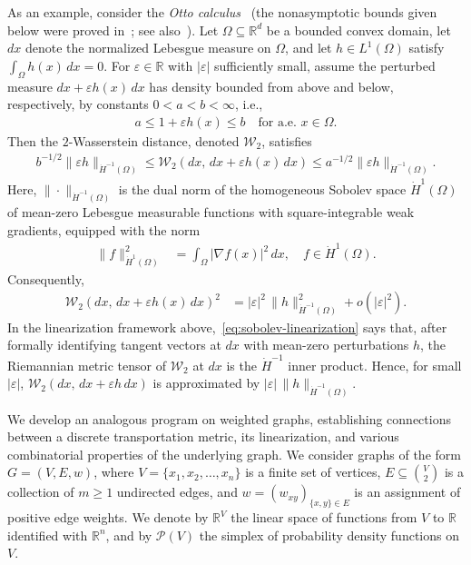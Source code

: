 \documentclass[11pt,a4paper]{article}
\newcommand{\Wass}{\mathcal{W}}
\newcommand{\Prob}{\mathscr{P}}
\begin{document}
As an example, consider the \emph{Otto calculus}~\cite{otto2001geometry} (the nonasymptotic bounds given below were proved in~\cite{peyre2018comparison}; see also~\cite[Sec. 5.5.2]{santambrogio2015optimal}). Let $\Omega\subseteq\mathbb{R}^{d}$ be a bounded convex domain, let $dx$ denote the normalized Lebesgue measure on $\Omega$, and let $h\in L^{1}(\Omega)$ satisfy $\int_{\Omega} h(x)\,dx = 0$. For $\varepsilon\in\mathbb{R}$ with $|\varepsilon|$ sufficiently small, assume the perturbed measure $dx+\varepsilon h(x)\,dx$ has density bounded from above and below, respectively, by constants $0 < a < b < \infty$, i.e.,
    \begin{align*}
        a \le 1+\varepsilon h(x) \le b \quad \text{for a.e. } x\in\Omega.
    \end{align*}
Then the $2$-Wasserstein distance, denoted $\Wass_{2}$, satisfies
    \begin{align}\label{eq:sobolev-linearization}
        b^{-1/2}\|\varepsilon h\|_{\dot{H}^{-1}(\Omega)} \leq \Wass_{2}(dx,\,dx+\varepsilon h(x)\,dx) \leq a^{-1/2} \|\varepsilon h\|_{\dot{H}^{-1}(\Omega)}.
    \end{align}
Here, $\|\cdot\|_{\dot{H}^{-1}(\Omega)}$ is the dual norm of the homogeneous Sobolev space $\dot{H}^{1}(\Omega)$ of mean-zero Lebesgue measurable functions with square-integrable weak gradients, equipped with the norm
    \begin{align*}
        \|f\|_{\dot{H}^1(\Omega)}^2 &= \int_{\Omega} |\nabla f(x)|^2\,dx,\quad f\in\dot{H}^{1}(\Omega).
    \end{align*}
Consequently,
    \begin{align}\label{eq:sobolev-linearization-asymptotic}
        \Wass_{2}(dx,\,dx+\varepsilon h(x)\,dx)^2 &= |\varepsilon|^2\,\|h\|_{\dot{H}^{-1}(\Omega)}^2 + o(|\varepsilon|^2).
    \end{align}
In the linearization framework above,~\cref{eq:sobolev-linearization} says that, after formally identifying tangent vectors at $dx$ with mean-zero perturbations $h$, the Riemannian metric tensor of $\Wass_2$ at $dx$ is the $\dot{H}^{-1}$ inner product. Hence, for small $|\varepsilon|$, $\Wass_2(dx,\,dx+\varepsilon h\,dx)$ is approximated by $|\varepsilon|\,\|h\|_{\dot{H}^{-1}(\Omega)}$.

We develop an analogous program on weighted graphs, establishing connections between a discrete transportation metric, its linearization, and various combinatorial properties of the underlying graph. We consider graphs of the form $G=(V,E,w)$, where $V=\{x_1,x_2,\dotsc, x_n\}$ is a finite set of vertices, $E\subseteq\binom{V}{2}$ is a collection of $m\geq 1$ undirected edges, and $w=(w_{xy})_{\{x, y\}\in E}$ is an assignment of positive edge weights. We denote by $\mathbb{R}^{V}$ the linear space of functions from $V$ to $\mathbb{R}$ identified with $\mathbb{R}^{n}$, and by $\Prob(V)$ the simplex of probability density functions on $V$. 
\end{document}
